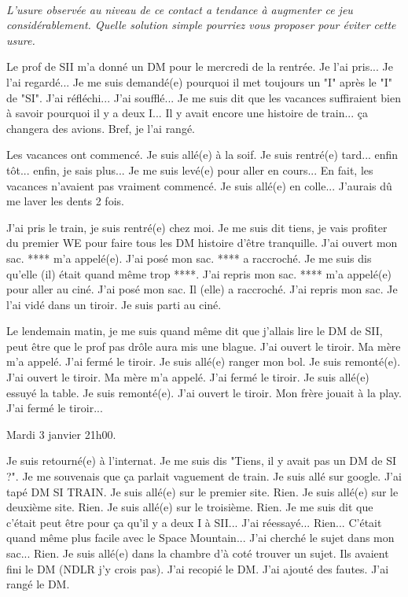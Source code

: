 \documentclass[11pt,oneside]{article}
\begin{document}
\paragraph{}
\textit{L'usure observée au niveau de ce contact a tendance à augmenter ce jeu considérablement. Quelle solution simple pourriez vous proposer pour éviter cette usure.}
 

\vspace{2cm}

Le prof de SII m'a donné un DM pour le mercredi de la rentrée. Je l'ai pris... Je l'ai regardé... Je me suis demandé(e) pourquoi il met toujours un "I" après le "I" de "SI". J'ai réfléchi... J'ai soufflé... Je me suis dit que les vacances suffiraient bien à savoir pourquoi il y a deux I... Il y avait encore une histoire de train... ça changera des avions. Bref, je l'ai rangé. 

Les vacances ont commencé. Je suis allé(e) à la soif. Je suis rentré(e) tard... enfin tôt... enfin, je sais plus... Je me suis levé(e) pour aller en cours... En fait, les vacances n'avaient pas vraiment commencé. Je suis allé(e) en colle... J'aurais dû me laver les dents 2 fois.

J'ai pris le train, je suis rentré(e) chez moi. Je me suis dit tiens, je vais profiter du premier WE pour faire tous les DM histoire d'être tranquille. J'ai ouvert mon sac. **** m'a appelé(e). J'ai posé mon sac. **** a raccroché. Je me suis dis qu'elle (il) était quand même trop ****. J'ai repris mon sac. **** m'a appelé(e) pour aller au ciné. J'ai posé mon sac. Il (elle) a raccroché. J'ai repris mon sac. Je l'ai vidé dans un tiroir. Je suis parti au ciné.

Le lendemain matin, je me suis quand même dit que j'allais lire le DM de SII, peut être que le prof pas drôle aura mis une blague. J'ai ouvert le tiroir. Ma mère m'a appelé. J'ai fermé le tiroir. Je suis allé(e) ranger mon bol. Je suis remonté(e). J'ai ouvert le tiroir. Ma mère m'a appelé. J'ai fermé le tiroir. Je suis allé(e) essuyé la table. Je suis remonté(e). J'ai ouvert le tiroir. Mon frère jouait à la play. J'ai fermé le tiroir...

Mardi 3 janvier 21h00. 

Je suis retourné(e) à l'internat. Je me suis dis "Tiens, il y avait pas un DM de SI ?". Je me souvenais que ça parlait vaguement de train. Je suis allé sur google. J'ai tapé DM SI TRAIN. Je suis allé(e) sur le premier site. Rien. Je suis allé(e) sur le deuxième site. Rien. Je suis allé(e) sur le troisième. Rien. Je me suis dit que c'était peut être pour ça qu'il y a deux I à SII... J'ai réessayé... Rien... C'était quand même plus facile avec le Space Mountain... J'ai cherché le sujet dans mon sac... Rien. Je suis allé(e) dans la chambre d'à coté trouver un sujet. Ils avaient fini le DM (NDLR j'y crois pas). J'ai recopié le DM. J'ai ajouté des fautes. J'ai rangé le DM. 
\end{document}
